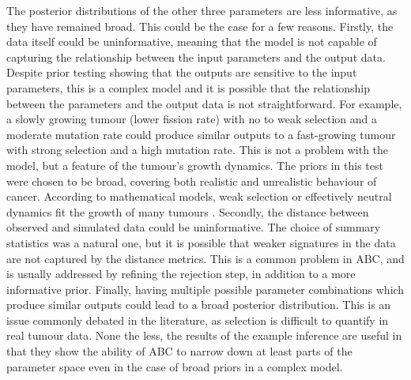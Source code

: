 The posterior distributions of the other three parameters are less informative,
as they have remained broad. This could be the case for a few reasons. Firstly,
the data itself could be uninformative, meaning that the model is not capable
of capturing the relationship between the input parameters and the output data.
Despite prior testing showing that the outputs are sensitive to the input
parameters, this is a complex model and it is possible that the relationship
between the parameters and the output data is not straightforward. For example,
a slowly growing tumour (lower fission rate) with no to weak selection and a
moderate mutation rate could produce similar outputs to a fast-growing tumour
with strong selection and a high mutation rate. This is not a problem with the
model, but a feature of the tumour's growth dynamics. The priors in this test
were chosen to be broad, covering both realistic and unrealistic behaviour of
cancer. According to mathematical models, weak selection or effectively neutral
dynamics fit the growth of many tumours \cite{williams_identification_2016}.
Secondly, the distance between observed and simulated data could be
uninformative. The choice of summary statistics was a natural one, but it is
possible that weaker signatures in the data are not captured by the distance
metrics. This is a common problem in ABC, and is usually addressed by refining
the rejection step, in addition to a more informative prior. Finally, having
multiple possible parameter combinations which produce similar outputs could
lead to a broad posterior distribution. This is an issue commonly debated in
the literature, as selection is difficult to quantify in real tumour data. None
the less, the results of the example inference are useful in that they show the
ability of ABC to narrow down at least parts of the parameter space even in the
case of broad priors in a complex model.


